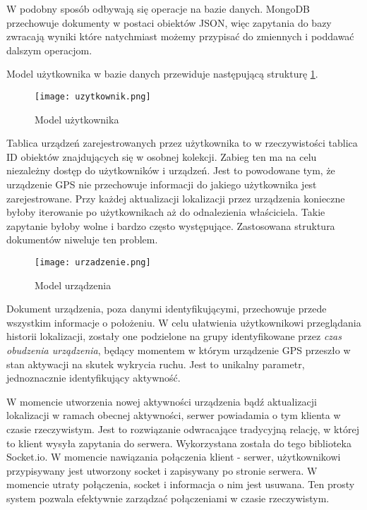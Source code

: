 \documentclass[eng,printmode]{mgr}
\begin{document}
W podobny sposób odbywają się operacje na bazie danych. MongoDB przechowuje dokumenty w postaci obiektów JSON, więc zapytania do bazy zwracają wyniki które natychmiast możemy przypisać do zmiennych i poddawać dalszym operacjom.

Model użytkownika w bazie danych przewiduje następującą strukturę \ref{fig:uzyt}.
\begin{figure}
\centering
\hspace*{-2.3cm}
\texttt{[image: uzytkownik.png]}
\caption{Model użytkownika}
\label{fig:uzyt}
\end{figure}
Tablica urządzeń zarejestrowanych przez użytkownika to w rzeczywistości tablica ID obiektów znajdujących się w osobnej kolekcji. Zabieg ten ma na celu niezależny dostęp do użytkowników i urządzeń. Jest to powodowane tym, że urządzenie GPS nie przechowuje informacji do jakiego użytkownika jest zarejestrowane. Przy każdej aktualizacji lokalizacji przez urządzenia konieczne byłoby iterowanie po użytkownikach aż do odnalezienia właściciela. Takie zapytanie byłoby wolne i bardzo często występujące. Zastosowana struktura dokumentów niweluje ten problem.

\begin{figure}
\centering
\texttt{[image: urzadzenie.png]}
\caption{Model urządzenia}
\label{fig:urz}
\end{figure}

Dokument urządzenia, poza danymi identyfikującymi, przechowuje przede wszystkim informacje o położeniu. W celu ułatwienia użytkownikowi przeglądania historii lokalizacji, zostały one podzielone na grupy identyfikowane przez \textit{czas obudzenia urządzenia}, będący momentem w którym urządzenie GPS przeszło w stan aktywacji na skutek wykrycia ruchu. Jest to unikalny parametr, jednoznacznie identyfikujący aktywność.

W momencie utworzenia nowej aktywności urządzenia bądź aktualizacji lokalizacji w ramach obecnej aktywności, serwer powiadamia o tym klienta w czasie rzeczywistym. Jest to rozwiązanie odwracające tradycyjną relację, w której to klient wysyła zapytania do serwera. Wykorzystana została do tego biblioteka Socket.io. W momencie nawiązania połączenia klient - serwer, użytkownikowi przypisywany jest utworzony socket i zapisywany po stronie serwera. W momencie utraty połączenia, socket i informacja o nim jest usuwana. Ten prosty system pozwala efektywnie zarządzać połączeniami w czasie rzeczywistym.
\end{document}

